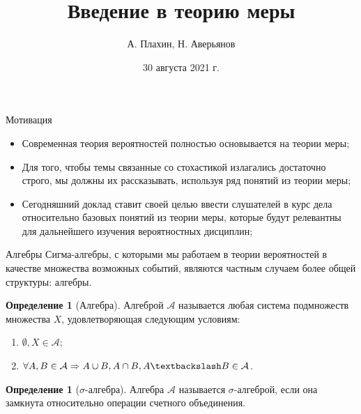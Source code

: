 \documentclass{beamer}%
\title{Введение в теорию меры}
\author[А. Плахин, Н. Аверьянов]{А. Плахин, Н. Аверьянов}
\institute[Клуб теории вероятностей]{Клуб теории вероятностей ФЭН ВШЭ}
\date{30 августа 2021 г.}
\theoremstyle{definition}
\newtheorem{mydef}[theorem]{Определение}
\begin{document}
\begin{frame}
\titlepage
\end{frame}


\begin{frame}{Мотивация}
\begin{itemize}
    \item Современная теория вероятностей полностью основывается на теории меры;
    \item Для того, чтобы темы связанные со стохастикой излагались достаточно строго, мы должны их рассказывать, используя ряд понятий из теории меры;
    \item Сегодняшний доклад ставит своей целью ввести слушателей в курс дела относительно базовых понятий из теории меры, которые будут релевантны для дальнейшего изучения вероятностных дисциплин;
\end{itemize}

\end{frame}


\begin{frame}{Алгебры}
    Сигма-алгебры, с которыми мы работаем в теории вероятностей в качестве множества возможных событий, являются частным случаем более общей структуры: алгебры.
    
    \begin{mydef}[Алгебра]
    Алгеброй $\mathcal{A}$ называется любая система подмножеств множества $X$, удовлетворяющая следующим условиям:
    \begin{enumerate}
        \item $\emptyset, X \in \mathcal{A}$;
        \item $\forall A, B \in \mathcal{A} \Rightarrow A \cup B, A \cap B, A \textbackslash B \in \mathcal{A}$.
    \end{enumerate}
    \end{mydef}
    
    \begin{mydef}[$\sigma$-алгебра]
    Алгебра $\mathcal{A}$ называется $\sigma$-алгеброй, если она замкнута относительно операции счетного объединения.
    \end{mydef}
    
\end{frame}
\end{document}
